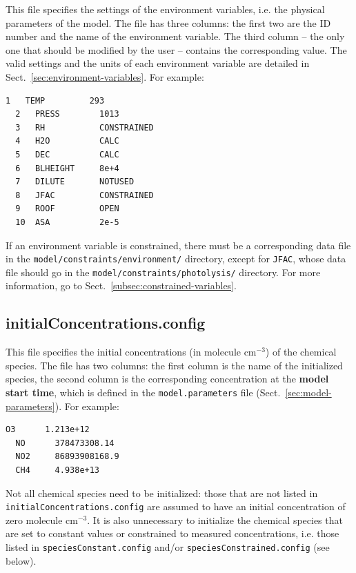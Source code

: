 This file specifies the settings of the environment variables, i.e. the physical parameters of
the model. The file has three columns: the first two are the ID number and the name of the
environment variable. The third column -- the only one that should be modified by the user --
contains the corresponding value. The valid settings and the units of each environment variable
are detailed in Sect.~\ref{sec:environment-variables}. For example:

\begin{Verbatim}[fontsize=\small]
  1   TEMP         293
  2   PRESS        1013
  3   RH           CONSTRAINED
  4   H2O          CALC
  5   DEC          CALC
  6   BLHEIGHT     8e+4
  7   DILUTE       NOTUSED
  8   JFAC         CONSTRAINED
  9   ROOF         OPEN
  10  ASA          2e-5
\end{Verbatim}

If an environment variable is constrained, there must be a corresponding data file in the
\texttt{model/constraints/environment/} directory, except for \texttt{JFAC}, whose data file
should go in the \texttt{model/constraints/photolysis/} directory. For more information, go to
Sect.~\ref{subsec:constrained-variables}.

\subsection{initialConcentrations.config} \label{subsec:initialconcentrations}

This file specifies the initial concentrations (in molecule cm$^{-3}$) of the chemical
species. The file has two columns: the first column is the name of the initialized species, the
second column is the corresponding concentration at the \textbf{model start time}, which is
defined in the \texttt{model.parameters} file (Sect.~\ref{sec:model-parameters}). For example:

\begin{Verbatim}[fontsize=\small]
  O3      1.213e+12
  NO      378473308.14
  NO2     86893908168.9
  CH4     4.938e+13
\end{Verbatim}

Not all chemical species need to be initialized: those that are not listed in
\texttt{initialConcentrations.config} are assumed to have an initial concentration of zero
molecule cm$^{-3}$. It is also unnecessary to initialize the chemical species that are set to
constant values or constrained to measured concentrations, i.e. those listed in
\texttt{speciesConstant.config} and/or \texttt{speciesConstrained.config} (see below).

